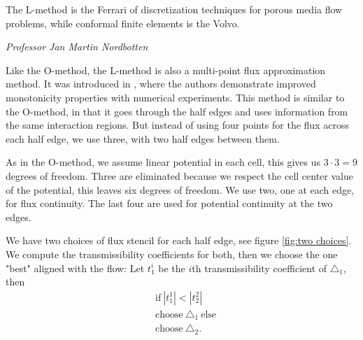 \documentclass[../Main/main.tex]{subfiles}
\begin{document}
	\epigraph{The L-method is the Ferrari of discretization techniques for porous media flow problems, while conformal finite elements is the Volvo.}{\textit{Professor Jan Martin Nordbotten}}
	Like the O-method, the L-method is also a multi-point flux approximation method. It was introduced in \cite{https://doi.org/10.1002/num.20320}, where the authors demonstrate improved monotonicity properties with numerical experiments. This method is similar to the O-method, in that it goes through the half edges and uses information from the same interaction regions. But instead of using four points for the flux across each half edge, we use three, with two half edges between them. \par
	As in the O-method, we assume linear potential in each cell, this gives us $3\cdot 3 = 9$ degrees of freedom. Three are eliminated because we respect the cell center value of the potential, this leaves six degrees of freedom. We use two, one at each edge, for flux continuity. The last four are used for potential continuity at the two edges. 
	\par
	We have two choices of flux stencil for each half edge, see figure \ref{fig:two choices}. We compute the transmissibility coefficients for both, then we choose the one "best" aligned with the flow: Let $t_1^i$ be the $i$th transmissibility coefficient of $\triangle_1$, then
	\begin{equation}\label{eq:L-criterion}
		\begin{aligned}
			&\text{if} \ |t^1_1| < |t^2_2| \\
			&\text{choose} \ \triangle_1 \ \text{else} \\
			&\text{choose} \ \triangle_2.
		\end{aligned}
	\end{equation}
\end{document}
